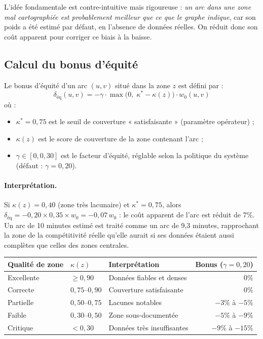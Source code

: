 \documentclass[12pt,a4paper]{article}
\theoremstyle{definition}
\theoremstyle{remark}
\begin{document}
L'idée fondamentale est contre-intuitive mais rigoureuse :
\emph{un arc dans une zone mal cartographiée est probablement
meilleur que ce que le graphe indique}, car son poids a été
estimé par défaut, en l'absence de données réelles. On réduit
donc son coût apparent pour corriger ce biais à la baisse.

\subsection{Calcul du bonus d'équité}

Le bonus d'équité d'un arc $(u,v)$ situé dans la zone $z$ est défini par :
\[
  \delta_\text{éq}(u,v) = -\gamma \cdot \max\bigl(0,\; \kappa^* - \kappa(z)\bigr)
  \cdot w_0(u,v)
\]
où :
\begin{itemize}[leftmargin=2em]
  \item $\kappa^* = 0{,}75$ est le seuil de couverture « satisfaisante »
    (paramètre opérateur) ;
  \item $\kappa(z)$ est le score de couverture de la zone contenant l'arc ;
  \item $\gamma \in [0, 0{,}30]$ est le facteur d'équité, réglable selon
    la politique du système (défaut : $\gamma = 0{,}20$).
\end{itemize}

\paragraph{Interprétation.} Si $\kappa(z) = 0{,}40$ (zone très lacunaire)
et $\kappa^* = 0{,}75$, alors $\delta_\text{éq} = -0{,}20 \times 0{,}35
\times w_0 = -0{,}07\,w_0$ : le coût apparent de l'arc est réduit de 7\%.
Un arc de 10 minutes estimé est traité comme un arc de 9,3 minutes,
rapprochant la zone de la compétitivité réelle qu'elle aurait si ses
données étaient aussi complètes que celles des zones centrales.

\begin{center}
\begin{tabular}{lllr}
  \toprule
  \textbf{Qualité de zone} & $\kappa(z)$ & \textbf{Interprétation} & \textbf{Bonus ($\gamma=0{,}20$)} \\
  \midrule
  Excellente  & $\geq 0{,}90$ & Données fiables et denses     & $0\%$ \\
  Correcte    & $0{,}75$--$0{,}90$ & Couverture satisfaisante   & $0\%$ \\
  Partielle   & $0{,}50$--$0{,}75$ & Lacunes notables           & $-3\%$ à $-5\%$ \\
  Faible      & $0{,}30$--$0{,}50$ & Zone sous-documentée       & $-5\%$ à $-9\%$ \\
  Critique    & $< 0{,}30$     & Données très insuffisantes    & $-9\%$ à $-15\%$ \\
  \bottomrule
\end{tabular}
\end{center}
\end{document}
